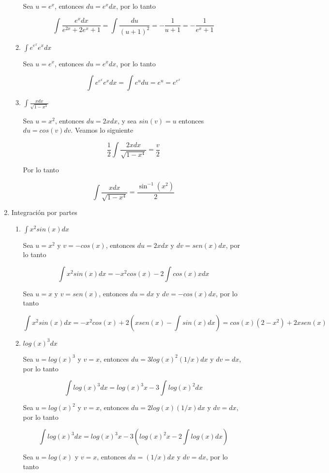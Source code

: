 \documentclass[letterpaper]{article}
\theoremstyle{definition}
\theoremstyle{definition}
\begin{document}
\begin{enumerate}
\begin{enumerate}
    Sea $u = e^x$, entonces $du = e^xdx$, por lo tanto

    \[\int \frac{e^xdx}{e^{2x} + 2e^x + 1} = \int \frac{du}{(u + 1)^2} = -\frac{1}{u+1} = -\frac{1}{e^x+1}\]

    \item $\int e^{e^x} e^x dx$
    
    Sea $u = e^x$, entonces $du = e^x dx$, por lo tanto

    \[\int e^{e^x} e^x dx = \int e^u du = e^u = e^{e^x}\]

    \item $\int \frac{xdx}{\sqrt{1-x^4}}$
    
    Sea $u = x^2$, entonces $du = 2xdx$, y sea $sin(v) = u$ entonces $du = cos(v)dv$. Veamos lo siguiente

    \[\frac{1}{2} \int \frac{2xdx}{\sqrt{1-x^4}} = \frac{v}{2}\]

    Por lo tanto

    \[\int \frac{xdx}{\sqrt{1-x^4}} = \frac{\sin^{-1}(x^2)}{2}\]

  \end{enumerate}

  \item Integración por partes
  
  \begin{enumerate}
    \item $\int x^2sin(x)dx$
    
    Sea $u = x^2$ y $v = -cos(x)$, entonces $du = 2xdx$ y $dv = sen(x)dx$, por lo tanto

    \[\int x^2sin(x)dx = -x^2cos(x) - 2\int cos(x)xdx\]

    Sea $u = x$ y $v = sen(x)$, entonces $du = dx$ y $dv = -cos(x)dx$, por lo tanto

    \[\int x^2sin(x)dx = -x^2cos(x) + 2\left(xsen(x) - \int sin(x)dx\right) = cos(x)(2-x^2) + 2xsen(x)\]

    \item $log(x)^3dx$
    
    Sea $u = log(x)^3$ y $v = x$, entonces $du = 3log(x)^2(1/x)dx$ y $dv = dx$, por lo tanto

    \[\int log(x)^3dx = log(x)^3x - 3\int log(x)^2dx\]

    Sea $u = log(x)^2$ y $v = x$, entonces $du = 2log(x)(1/x)dx$ y $dv = dx$, por lo tanto

    \[\int log(x)^3dx = log(x)^3x - 3\left(log(x)^2x - 2\int log(x)dx\right)\]

    Sea $u = log(x)$ y $v = x$, entonces $du = (1/x)dx$ y $dv = dx$, por lo tanto


\end{enumerate}
\end{enumerate}
\end{document}
